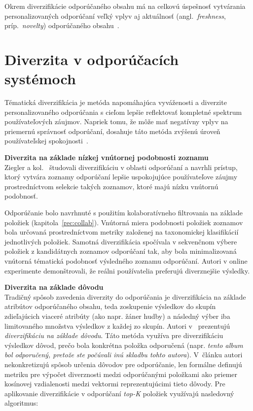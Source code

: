 Okrem diverzifikácie odporúčaného obsahu má na celkovú úspešnosť vytvárania personalizovaných odporúčaní veľký vplyv aj
aktuálnosť (angl.~\emph{freshness}, príp.~\emph{novelty}) odporúčaného obsahu~\cite{Liu2015}.

\section{Diverzita v odporúčacích systémoch}

Tématická diverzifikácia je metóda napomáhajúca vyváženosti a diverzite personalizovaného odporúčania s cieľom
lepšie reflektovať kompletné spektrum používateľových záujmov. Napriek tomu, že môže mať negatívny vplyv na priemernú
správnosť odporúčaní, dosahuje táto metóda zvýšenú úroveň používateľskej spokojnosti~\cite{Zhang2009}.

\textbf{Diverzita na základe nízkej vnútornej podobnosti zoznamu}\\
Ziegler a kol.~\cite{Ziegler2005} študovali diverzifikáciu v oblasti odporúčaní a navrhli prístup, ktorý vytvára
zoznamy odporúčaní lepšie uspokojujúce používateľove záujmy prostredníctvom selekcie takých zoznamov, ktoré majú nízku
vnútornú podobnosť.

Odporúčanie bolo navrhnuté s použitím kolaboratívneho filtrovania na základe položiek (kapitola~\ref{rec:collab}).
Vnútorná miera podobnosti položiek zoznamov bola určovaná prostredníctvom metriky založenej na taxonomickej klasifikácií
jednotlivých položiek. Samotná diverzifikácia spočívala v sekvenčnom výbere položiek z kandidátnych zoznamov odporúčaní tak,
aby bola minimalizovaná vnútorná tématická podobnosť výsledného zoznamu odporúčaní.
Autori v online experimente demonštrovali, že reálni používatelia preferujú diverznejšie výsledky.


\textbf{Diverzita na základe dôvodu}\\
Tradičný spôsob zavedenia diverzity do odporúčania je diverzifikácia na základe atribútov odporúčaného obsahu, teda
zoskupenie výsledkov do skupín zdieľajúcich viaceré atribúty (ako napr. žáner hudby) a následný výber iba limitovaného
množstva výsledkov z každej zo skupín. Autori v~\cite{Yu2009} prezentujú \emph{diverzifikáciu na základe dôvodu}.
Táto metóda využíva pre diverzifikáciu výsledkov dôvod, prečo bola konkrétna položka odporučená
(napr. \textit{tento album bol odporučený, pretože ste počúvali inú skladbu tohto autora}).
V článku autori nekonkretizujú spôsob určenia dôvodov pre odporúčanie, len formálne definujú metriku pre výpočet diverznosti
medzi odporúčanými položkami ako priemer kosínovej vzdialenosti medzi vektormi reprezentujúcimi tieto dôvody.
Pre aplikovanie diverzifikácie v odporúčaní \emph{top-K} položiek využívajú nasledovný algoritmus:

